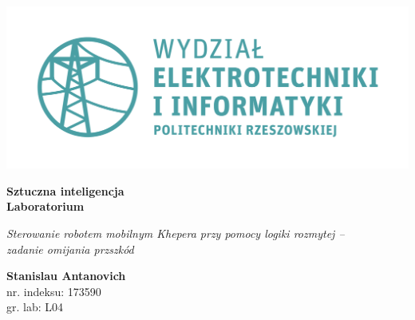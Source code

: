 \documentclass[a4paper, 10pt]{article}
\begin{document}
\begin{titlepage}
\begin{center}
        \includegraphics[scale=0.7]{logo.png}

        \vspace*{4cm}
        \textbf{Sztuczna inteligencja\\ Laboratorium}

        \vspace{1.5cm}
        \textit{Sterowanie robotem mobilnym Khepera przy pomocy logiki rozmytej -- \\zadanie omijania przszkód}

        \vspace{1.5cm}
        \textbf{Stanislau Antanovich}\\
        nr. indeksu: 173590\\
        gr. lab: L04 
\end{center}
\end{titlepage}

\tableofcontents
\listoffigures

\newpage




\end{document}
